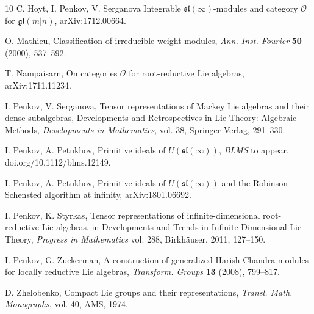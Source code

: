 \documentclass[12pt]{amsart}
\begin{document}
\begin{thebibliography}{10}
 C. Hoyt, I. Penkov, V. Serganova  Integrable $\mathfrak{sl}(\infty)$-modules and category $\mathcal{O}$ for $\mathfrak{gl}(m|n)$, arXiv:1712.00664.

 O. Mathieu, Classification of irreducible weight modules, {\it
Ann. Inst. Fourier} {\bf 50} (2000), 537--592.


 T. Nampaisarn, On categories $\mathcal{O}$ for root-reductive Lie algebras, arXiv:1711.11234.

  I. Penkov, V. Serganova, Tensor representations of Mackey Lie algebras and their dense subalgebras, Developments and Retrospectives in Lie Theory: Algebraic Methods, {\it Developments in Mathematics}, vol. 38, Springer Verlag, 291--330.

 I. Penkov, A. Petukhov, Primitive ideals of $U(\mathfrak{sl} (\infty))$, {\it BLMS} to appear, doi.org/10.1112/blms.12149.

 I. Penkov, A. Petukhov, Primitive ideals of $U(\mathfrak{sl}(\infty))$ and the Robinson-Schensted algorithm at infinity, arXiv:1801.06692.

 I. Penkov, K. Styrkas, Tensor representations of infinite-dimensional root-reductive Lie algebras, in Developments and Trends in Infinite-Dimensional Lie Theory, {\it Progress in Mathematics} vol. 288, Birkh\"auser, 2011, 127--150. 

 I. Penkov, G. Zuckerman, A construction of generalized Harish-Chandra modules for locally reductive Lie algebras, {\it Transform.  Groups} {\bf 13} (2008), 799--817.

 D. Zhelobenko, Compact Lie groups and their representations, {\it Transl. Math. Monographs}, vol.  40, AMS,  1974.



\end{thebibliography}
\end{document}
